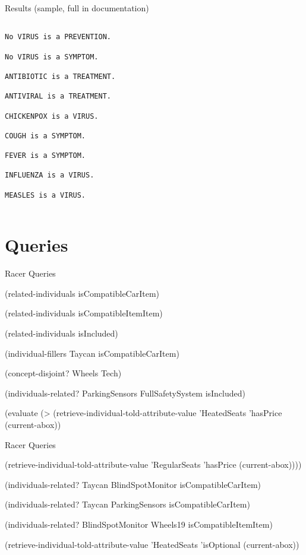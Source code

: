 \documentclass{beamer}
\begin{document}
\begin{frame}{Results (sample, full in documentation)}
    \begin{lstlisting}

No VIRUS is a PREVENTION.

No VIRUS is a SYMPTOM.

ANTIBIOTIC is a TREATMENT.

ANTIVIRAL is a TREATMENT.

CHICKENPOX is a VIRUS.

COUGH is a SYMPTOM.

FEVER is a SYMPTOM.

INFLUENZA is a VIRUS.

MEASLES is a VIRUS.


    \end{lstlisting}
\end{frame}


\section{Queries}

\begin{frame}{Racer Queries}
\begin{examples}
    (related-individuals isCompatibleCarItem)

(related-individuals isCompatibleItemItem)

(related-individuals isIncluded)

(individual-fillers Taycan isCompatibleCarItem)

(concept-disjoint? Wheels Tech)

(individuals-related? ParkingSensors FullSafetySystem isIncluded)

(evaluate (> (retrieve-individual-told-attribute-value 'HeatedSeats 'hasPrice (current-abox))
\end{examples}

\end{frame}

\begin{frame}{Racer Queries}
    \begin{examples}
        
(retrieve-individual-told-attribute-value 'RegularSeats 'hasPrice (current-abox))))

(individuals-related? Taycan BlindSpotMonitor isCompatibleCarItem)

(individuals-related? Taycan ParkingSensors isCompatibleCarItem)

(individuals-related? BlindSpotMonitor Wheels19 isCompatibleItemItem)

(retrieve-individual-told-attribute-value 'HeatedSeats 'isOptional (current-abox))
    \end{examples}
\end{frame}
\end{document}
